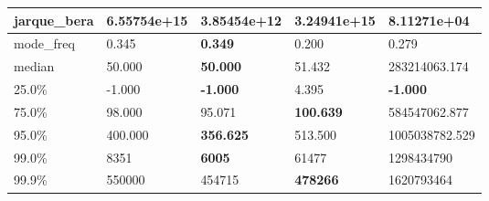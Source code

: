 \begin{table}[H]
\begin{tabular}{|l|m{10em}|m{10em}|m{10em}|m{10em}|}
\hline jarque\_bera & 6.55754e+15 & 3.85454e+12 & \bfseries 3.24941e+15 & \cellcolor[rgb]{0.9, 0.54, 0.52} 8.11271e+04 \\
\hline mode\_freq & 0.345 & \bfseries 0.349 & \cellcolor[rgb]{0.9, 0.54, 0.52} 0.200 & 0.279 \\
\hline median & 50.000 & \bfseries 50.000 & 51.432 & \cellcolor[rgb]{0.9, 0.54, 0.52} 283214063.174 \\
\hline 25.0\% & -1.000 & \bfseries -1.000 & \cellcolor[rgb]{0.9, 0.54, 0.52} 4.395 & \bfseries -1.000 \\
\hline 75.0\% & 98.000 & 95.071 & \bfseries 100.639 & \cellcolor[rgb]{0.9, 0.54, 0.52} 584547062.877 \\
\hline 95.0\% & 400.000 & \bfseries 356.625 & 513.500 & \cellcolor[rgb]{0.9, 0.54, 0.52} 1005038782.529 \\
\hline 99.0\% & 8351 & \bfseries 6005 & 61477 & \cellcolor[rgb]{0.9, 0.54, 0.52} 1298434790 \\
\hline 99.9\% & 550000 & 454715 & \bfseries 478266 & \cellcolor[rgb]{0.9, 0.54, 0.52} 1620793464 \\
\hline
\end{tabular}
\end{table}
